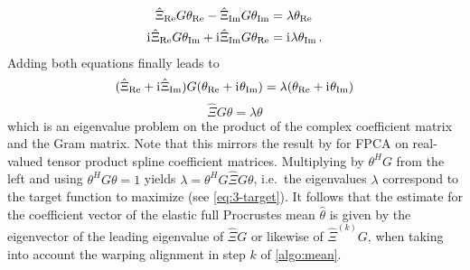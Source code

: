 \begin{align}
  \hat\Xi_{\mathrm{Re}} G \theta_{\mathrm{Re}} - \hat\Xi_{\mathrm{Im}} G \theta_{\mathrm{Im}} & = \lambda \theta_{\mathrm{Re}}\\
   \mathrm{i}\mkern1mu \hat\Xi_{\mathrm{Re}} G \theta_{\mathrm{Im}} + \mathrm{i}\mkern1mu \hat\Xi_{\mathrm{Im}} G \theta_{\mathrm{Re}} & = \mathrm{i}\mkern1mu \lambda \theta_{\mathrm{Im}} \,.
\end{align}
Adding both equations finally leads to  
\begin{equation}
  ( \hat\Xi_{\mathrm{Re}} + \mathrm{i}\mkern1mu \hat\Xi_{\mathrm{Im}}) G (\theta_{\mathrm{Re}} +  \mathrm{i}\mkern1mu \theta_{\mathrm{Im}}) = \lambda ( \theta_{\mathrm{Re}} + \mathrm{i}\mkern1mu \theta_{\mathrm{Im}})
\end{equation}
\begin{equation}
  \hat\Xi G \theta = \lambda \theta
\end{equation}
which is an eigenvalue problem on the product of the complex coefficient matrix and the Gram matrix.
Note that this mirrors the result by \cite{ReissXu2020} for FPCA on real-valued tensor product spline coefficient matrices.
Multiplying by $\theta^H G$ from the left and using $\theta^H G \theta = 1$ yields $\lambda = \theta^H G \hat\Xi G \theta$, i.e.\ the eigenvalues $\lambda$ correspond to the target function to maximize (see \cref{eq:3-target}).
It follows that the estimate for the coefficient vector of the elastic full Procrustes mean $\hat\theta$ is given by the eigenvector of the leading eigenvalue of $\hat\Xi G$ or likewise of $\hat\Xi^{(k)} G$, when taking into account the warping alignment in step $k$ of \cref{algo:mean}.

